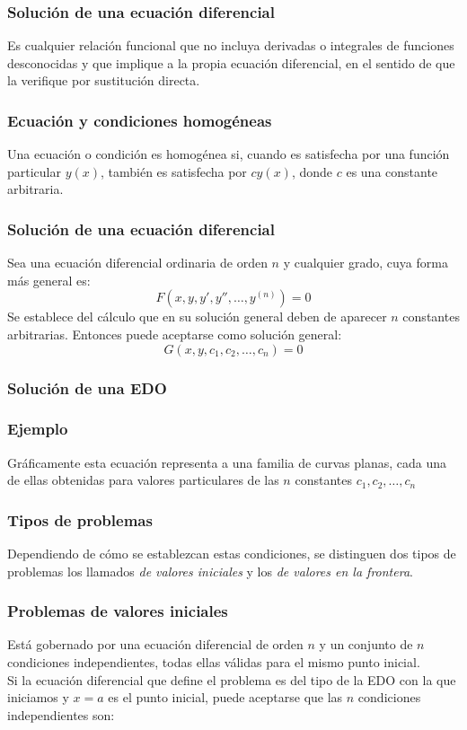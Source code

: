 \begin{frame}
\frametitle{Solución de una ecuación diferencial}
Es cualquier relación funcional que no incluya derivadas o integrales de funciones desconocidas y que implique a la propia ecuación diferencial, en el sentido de que la verifique por sustitución directa.
\end{frame}
\begin{frame}
\frametitle{Ecuación y condiciones homogéneas}
Una ecuación o condición es homogénea si, cuando es satisfecha por una función particular $y(x)$, también es satisfecha por $cy(x)$, donde $c$ es una constante arbitraria.
\end{frame}
\begin{frame}
\frametitle{Solución de una ecuación diferencial}
Sea una ecuación diferencial ordinaria de orden $n$ y cualquier grado, cuya forma más general es:
\[F(x, y, y', y'', \ldots, y^{(n)}) = 0\]
Se establece del cálculo que en su solución general deben de aparecer $n$ constantes arbitrarias. Entonces puede aceptarse como solución general:
\[G(x,y,c_{1},c_{2}, \ldots, c_{n}) = 0\]
\end{frame}
\begin{frame}[fragile]
\frametitle{Solución de una EDO}
\end{frame}
\begin{frame}
\frametitle{Ejemplo}
Gráficamente esta ecuación representa a una familia de curvas planas, cada una de ellas obtenidas para valores particulares de las $n$ constantes $c_{1}, c_{2}, \ldots, c_{n}$
\end{frame}
\begin{frame}
\frametitle{Tipos de problemas}
Dependiendo de cómo se establezcan estas condiciones, se distinguen dos tipos de problemas los llamados {\color{red}\textit{de valores iniciales}} y los {\color{red}\textit{de valores en la frontera}}.
\end{frame}
\begin{frame}
\frametitle{Problemas de valores iniciales}
Está gobernado por una ecuación diferencial de orden $n$ y un conjunto de $n$ condiciones independientes, todas ellas válidas para el mismo punto inicial.
\\
\medskip
Si la ecuación diferencial que define el problema es del tipo de la EDO con la que iniciamos y $x=a$ es el punto inicial, puede aceptarse que las $n$ condiciones independientes son:
\end{frame}
